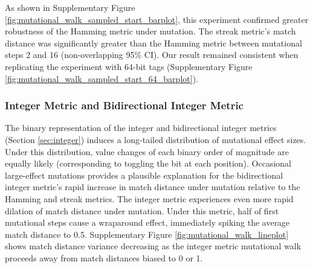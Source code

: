 As shown in Supplementary Figure \ref{fig:mutational_walk_sampled_start_barplot}, this experiment confirmed greater robustness of the Hamming metric under mutation.
The streak metric's match distance was significantly greater than the Hamming metric between mutational steps 2 and 16 (non-overlapping 95\% CI).
Our result remained consistent when replicating the experiment with 64-bit tags (Supplementary Figure \ref{fig:mutational_walk_sampled_start_64_barplot}).

\subsubsection{Integer Metric and Bidirectional Integer Metric}
\label{sec:mutation_integer}

The binary representation of the integer and bidirectional integer metrics (Section \ref{sec:integer}) induces a long-tailed distribution of mutational effect sizes.
Under this distribution, value changes of each binary order of magnitude are equally likely (corresponding to toggling the bit at each position).
Occasional large-effect mutations provides a plausible explanation for the bidirectional integer metric's rapid increase in match distance under mutation relative to the Hamming and streak metrics.
The integer metric experiences even more rapid dilation of match distance under mutation.
Under this metric, half of first mutational steps cause a wraparound effect, immediately spiking the average match distance to 0.5.
Supplementary Figure \ref{fig:mutational_walk_lineplot} shows match distance variance decreasing as the integer metric mutational walk proceeds away from match distances biased to 0 or 1.
